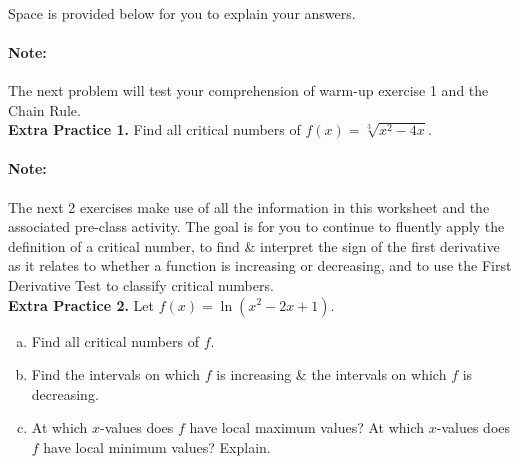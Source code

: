 \documentclass[10pt]{article}
\begin{document}
\,\hfill
{}
\hfill
\hfill
{}
\hfill
\hfill\,\\

Space is provided below for you to explain your answers.

\vfill


\paragraph*{Note:} The next problem will test your comprehension of warm-up exercise 1 and the Chain Rule.\\

{\bf\color{blue} Extra Practice 1.} \reversemarginpar{} Find all critical numbers of $f(x)=\sqrt[3]{x^2-4x}$.

\vfill



\newpage

\paragraph*{Note:} The next 2 exercises make use of all the information in this worksheet and the associated pre-class activity. The goal is for you to continue to fluently apply the definition of a critical number, to find \& interpret the sign of the first derivative as it relates to whether a function is increasing or decreasing, and to use the First Derivative Test to classify critical numbers.\\

{\bf\color{blue} Extra Practice 2.} \reversemarginpar{} Let $f(x)=\ln(x^2-2x+1)$. 
\begin{enumerate}[(a)]
\item Find all critical numbers of $f$.
    \vfill
    
\item Find the intervals on which $f$ is increasing \& the intervals on which $f$ is decreasing.
    \vfill
    \vfill

\item At which $x$-values does $f$ have local maximum values? At which $x$-values does $f$ have local minimum values? Explain.
    \vfill
\end{enumerate}
\end{document}
